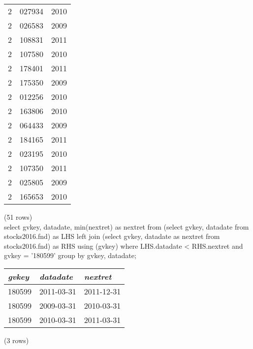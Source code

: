 \begin{tabular}{r | l | r}
2 & 027934 & 2010 \\
2 & 026583 & 2009 \\
2 & 108831 & 2011 \\
2 & 107580 & 2010 \\
2 & 178401 & 2011 \\
2 & 175350 & 2009 \\
2 & 012256 & 2010 \\
2 & 163806 & 2010 \\
2 & 064433 & 2009 \\
2 & 184165 & 2011 \\
2 & 023195 & 2010 \\
2 & 107350 & 2011 \\
2 & 025805 & 2009 \\
2 & 165653 & 2010 \\
\end{tabular}

\noindent (51 rows) \\

select gvkey, datadate, min(nextret) as nextret from
(select gvkey, datadate from stocks2016.fnd) as LHS
left join
(select gvkey, datadate as nextret from stocks2016.fnd) as RHS
using (gvkey)
where LHS.datadate < RHS.nextret
and gvkey = '180599'
group by gvkey, datadate;
\begin{tabular}{l | l | l}
\textit{gvkey} & \textit{datadate} & \textit{nextret} \\
\hline
180599 & 2011-03-31 & 2011-12-31 \\
180599 & 2009-03-31 & 2010-03-31 \\
180599 & 2010-03-31 & 2011-03-31 \\
\end{tabular}

\noindent (3 rows) \\

